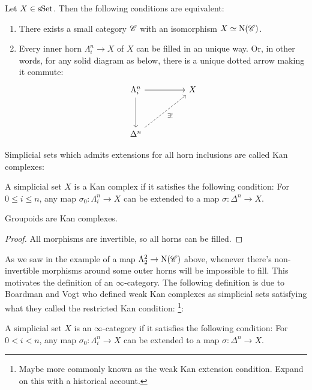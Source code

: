 \documentclass[../../thesis.tex]{subfiles}
\begin{document}
\begin{proposition}
    Let $X \in \mathrm{sSet}$.
    Then the following conditions are equivalent:
    \begin{enumerate}
        \item There exists a small category $\mathscr{C}$ with an isomorphism $X \simeq \mathrm{N}(\mathscr{C})$.
        \item Every inner horn $\Lambda_i^n \to X$ of $X$ can be filled in an unique way.
              Or, in other words, for any solid diagram as below, there is a unique dotted arrow making it commute:
              \[\begin{tikzcd}
                      {\Lambda_i^n} && X \\
                      \\
                      {\Delta^n}
                      \arrow[from=1-1, to=1-3]
                      \arrow[from=1-1, to=3-1]
                      \arrow["{\exists!}"', dashed, from=3-1, to=1-3]
                  \end{tikzcd}\]
    \end{enumerate}
\end{proposition}
Simplicial sets which admits extensions for all horn inclusions are called Kan complexes:
\begin{definition}
    A simplicial set $X$ is a Kan complex if it satisfies the following condition:
    For $0 \leq i \leq n$, any map $\sigma_0 : \Lambda_i^n \to X$ can be extended to a map $\sigma: \Delta^n \to X$.
\end{definition}
\begin{proposition}
    Groupoids are Kan complexes.
\end{proposition}
\begin{proof}
    All morphisms are invertible, so all horns can be filled.
\end{proof}
As we saw in the example of a map $\Lambda_2^2\to \mathrm{N}(\mathscr{C})$ above, whenever there's non-invertible morphisms around some outer horns will be impossible to fill.
This motivates the definition of an $\infty$-category.
The following definition is due to Boardman and Vogt \cite{BoardmanVogt} who defined weak Kan complexes as simplicial sets satisfying what they called the restricted Kan condition:
\footnote{Maybe more commonly known as the weak Kan extension condition. Expand on this with a historical account.}:
\begin{definition}
    A simplicial set $X$ is an $\infty$-category if it satisfies the following condition:
    For $0 < i < n$, any map $\sigma_0 : \Lambda_i^n \to X$ can be extended to a map $\sigma: \Delta^n \to X$.
\end{definition}
\end{document}
